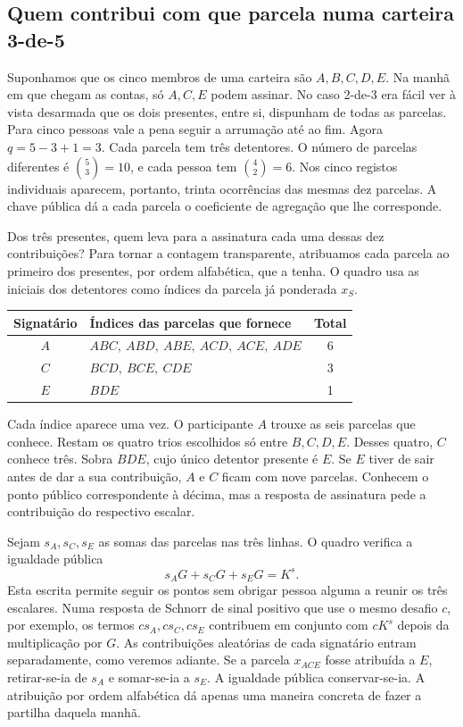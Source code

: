 \subsection{Quem contribui com que parcela numa carteira 3-de-5}
\label{sec:quorum-tres-cinco}

Suponhamos que os cinco membros de uma carteira são \(A,B,C,D,E\).
Na manhã em que chegam as contas, só \(A,C,E\) podem assinar. No
caso 2-de-3 era fácil ver à vista desarmada que os dois presentes,
entre si, dispunham de todas as parcelas. Para cinco pessoas vale
a pena seguir a arrumação até ao fim. Agora \(q=5-3+1=3\).
Cada parcela tem três detentores. O número de parcelas diferentes
é \(\binom53=10\), e cada pessoa tem \(\binom42=6\). Nos cinco
registos individuais aparecem, portanto, trinta ocorrências das
mesmas dez parcelas. A chave pública dá a cada parcela o
coeficiente de agregação que lhe corresponde.

Dos três presentes, quem leva para a assinatura cada uma dessas
dez contribuições? Para tornar a contagem transparente, atribuamos
cada parcela ao primeiro dos presentes, por ordem alfabética, que
a tenha. O quadro usa as iniciais dos detentores como índices da
parcela já ponderada \(x_S\).
\begin{center}
\begin{tabular}{c l c}
Signatário & Índices das parcelas que fornece & Total\\ \hline
\(A\) & \(ABC,\ ABD,\ ABE,\ ACD,\ ACE,\ ADE\) & 6\\
\(C\) & \(BCD,\ BCE,\ CDE\) & 3\\
\(E\) & \(BDE\) & 1
\end{tabular}
\end{center}
Cada índice aparece uma vez. O participante \(A\) trouxe as seis
parcelas que conhece. Restam os quatro trios escolhidos só entre
\(B,C,D,E\). Desses quatro, \(C\) conhece três. Sobra \(BDE\),
cujo único detentor presente é \(E\). Se \(E\) tiver de sair antes
de dar a sua contribuição, \(A\) e \(C\) ficam com nove parcelas.
Conhecem o ponto público correspondente à décima, mas a resposta
de assinatura pede a contribuição do respectivo escalar.

Sejam \(s_A,s_C,s_E\) as somas das parcelas nas três linhas.
O quadro verifica a igualdade pública
\[
                   s_AG+s_CG+s_EG=K^s .
\]
Esta escrita permite seguir os pontos sem obrigar pessoa alguma a
reunir os três escalares. Numa resposta de Schnorr de sinal
positivo que use o mesmo desafio \(c\), por exemplo, os termos
\(cs_A,cs_C,cs_E\) contribuem em conjunto com \(cK^s\) depois
da multiplicação por \(G\). As contribuições aleatórias de cada
signatário entram separadamente, como veremos adiante. Se a parcela
\(x_{ACE}\) fosse atribuída a \(E\), retirar-se-ia de \(s_A\) e
somar-se-ia a \(s_E\). A igualdade pública conservar-se-ia. A
atribuição por ordem alfabética dá apenas uma maneira concreta de
fazer a partilha daquela manhã.

